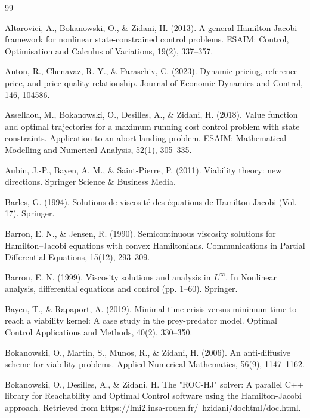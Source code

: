 \documentclass[]{interact}
\theoremstyle{plain}%
\theoremstyle{definition}
\theoremstyle{remark}
\begin{document}
\begin{thebibliography}{99}

Altarovici, A., Bokanowski, O., \& Zidani, H. (2013). A general Hamilton-Jacobi framework for nonlinear state-constrained control problems. ESAIM: Control, Optimisation and Calculus of Variations, 19(2), 337--357.

Anton, R., Chenavaz, R. Y., \& Paraschiv, C. (2023). Dynamic pricing, reference price, and price-quality relationship. Journal of Economic Dynamics and Control, 146, 104586.

Assellaou, M., Bokanowski, O., Desilles, A., \& Zidani, H. (2018). Value function and optimal trajectories for a maximum running cost control problem with state constraints. Application to an abort landing problem. ESAIM: Mathematical Modelling and Numerical Analysis, 52(1), 305--335.


Aubin, J.-P., Bayen, A. M., \& Saint-Pierre, P. (2011). Viability theory: new directions. Springer Science \& Business Media.

Barles, G. (1994). Solutions de viscosité des équations de Hamilton-Jacobi (Vol. 17). Springer.

Barron, E. N., \& Jensen, R. (1990). Semicontinuous viscosity solutions for Hamilton–Jacobi equations with convex Hamiltonians. Communications in Partial Differential Equations, 15(12), 293--309.

Barron, E. N. (1999). Viscosity solutions and analysis in $L^\infty$. In Nonlinear analysis, differential equations and control (pp. 1--60). Springer.

Bayen, T., \& Rapaport, A. (2019). Minimal time crisis versus minimum time to reach a viability kernel: A case study in the prey-predator model. Optimal Control Applications and Methods, 40(2), 330--350.

Bokanowski, O., Martin, S., Munos, R., \& Zidani, H. (2006). An anti-diffusive scheme for viability problems. Applied Numerical Mathematics, 56(9), 1147--1162.

Bokanowski, O., Desilles, A., \& Zidani, H. The "ROC-HJ" solver: A parallel C++ library for Reachability and Optimal Control software using the Hamilton-Jacobi approach. Retrieved from https://lmi2.insa-rouen.fr/~hzidani/dochtml/doc.html.


\end{thebibliography}
\end{document}
